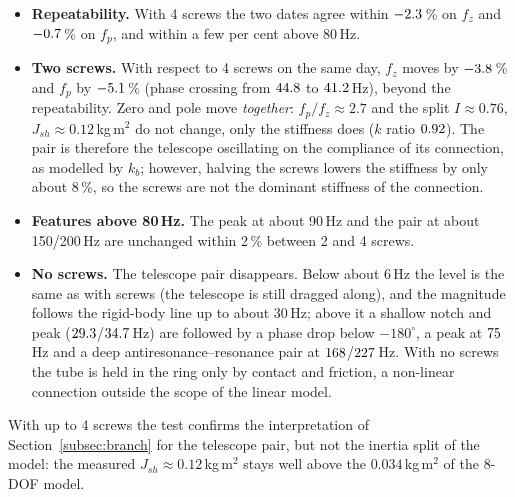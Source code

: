 \documentclass[10pt,a4paper]{article}
\numberwithin{equation}{section}
\begin{document}
\begin{itemize}
\item \textbf{Repeatability.} With 4 screws the two dates agree within $-2.3$\,\% on $f_z$ and $-0.7$\,\% on $f_p$, and within a few per cent above 80\,Hz.
\item \textbf{Two screws.} With respect to 4 screws on the same day, $f_z$ moves by $-3.8$\,\% and $f_p$ by $-5.1$\,\% (phase crossing from $44.8$ to $41.2$\,Hz), beyond the repeatability. Zero and pole move \emph{together}: $f_p/f_z \approx 2.7$ and the split $I \approx 0.76$, $J_{sh} \approx 0.12$\,kg\,m$^2$ do not change, only the stiffness does ($k$ ratio $0.92$). The pair is therefore the telescope oscillating on the compliance of its connection, as modelled by $k_b$; however, halving the screws lowers the stiffness by only about 8\,\%, so the screws are not the dominant stiffness of the connection.
\item \textbf{Features above 80\,Hz.} The peak at about 90\,Hz and the pair at about 150/200\,Hz are unchanged within 2\,\% between 2 and 4 screws.
\item \textbf{No screws.} The telescope pair disappears. Below about 6\,Hz the level is the same as with screws (the telescope is still dragged along), and the magnitude follows the rigid-body line up to about 30\,Hz; above it a shallow notch and peak ($29.3$/$34.7$\,Hz) are followed by a phase drop below $-180^\circ$, a peak at $75$\,Hz and a deep antiresonance--resonance pair at $168$/$227$\,Hz. With no screws the tube is held in the ring only by contact and friction, a non-linear connection outside the scope of the linear model.
\end{itemize}
With up to 4 screws the test confirms the interpretation of Section~\ref{subsec:branch} for the telescope pair, but not the inertia split of the model: the measured $J_{sh} \approx 0.12$\,kg\,m$^2$ stays well above the $0.034$\,kg\,m$^2$ of the 8-DOF model.
\end{document}
